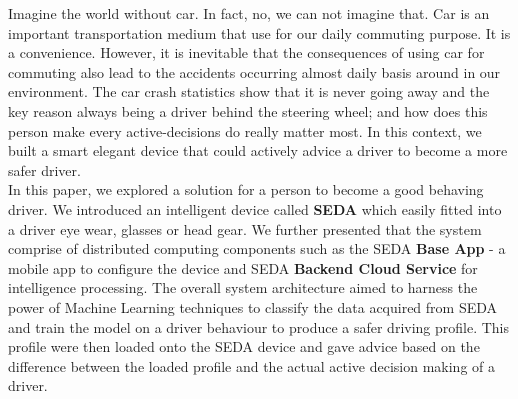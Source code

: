 \documentclass[main.tex]{subfiles}
\begin{document}
Imagine the world without car. In fact, no, we can not imagine that. Car is an important transportation medium that use for our daily commuting purpose. It is a convenience. However, it is inevitable that the consequences of using car for commuting also lead to the accidents occurring almost daily basis around in our environment. The car crash statistics \cite{crashstat1, crashstat2, crashstat3} show that it is never going away and the key reason always being a driver behind the steering wheel; and how does this person make every active-decisions do really matter most. In this context, we built a smart elegant device that could actively advice a driver to become a more safer driver.
\\

In this paper, we explored a solution for a person to become a good behaving driver. We introduced an intelligent device called \textbf{SEDA} which easily fitted into a driver eye wear, glasses or head gear. We further presented that the system comprise of distributed computing components such as the SEDA \textbf{Base App} - a mobile app to configure the device and SEDA \textbf{Backend Cloud Service} for intelligence processing. The overall system architecture aimed to harness the power of Machine Learning techniques to classify the data acquired from SEDA and train the model on a driver behaviour to produce a safer driving profile. This profile were then loaded onto the SEDA device and gave advice based on the difference between the loaded profile and the actual active decision making of a driver.
\end{document}
